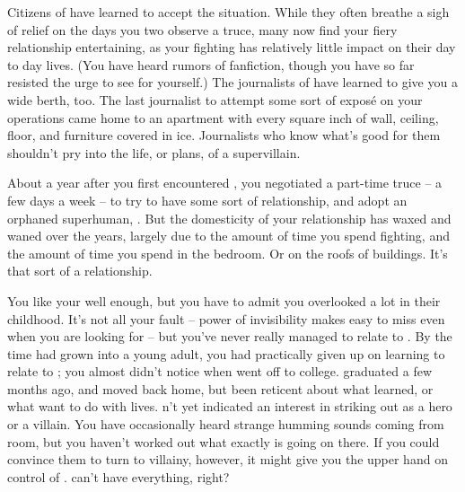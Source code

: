 \documentclass[char]{LRSguildcamp1}
\begin{document}
Citizens of \pCityO{} have learned to accept the situation. While they often breathe a sigh of relief on the days you two observe a truce, many now find your fiery relationship entertaining, as your fighting has relatively little impact on their day to day lives.  (You have heard rumors of fanfiction, though you have so far resisted the urge to see for yourself.)  The journalists of \pCityO{} have learned to give you a wide berth, too.  The last journalist to attempt some sort of expos\'e on your operations came home to an apartment with every square inch of wall, ceiling, floor, and furniture covered in ice.  Journalists who know what's good for them shouldn't pry into the life, or plans, of a supervillain.  

About a year after you first encountered \cOS{}, you negotiated a part-time truce -- a few days a week -- to try to have some sort of relationship, and adopt an orphaned superhuman, \cGrad{}.  
But the domesticity of your relationship has waxed and waned over the years, largely due to the amount of time you spend fighting, and the amount of time you spend in the bedroom.  
Or on the roofs of buildings.  
It's that sort of a relationship.  

You like your \cGrad{\offspring} well enough, but you have to admit you overlooked \cGrad{\them} a lot in their childhood.  
It's not all your fault -- \cGrad{\their} power of invisibility makes \cGrad{\them} easy to miss even when you are looking for \cGrad{\them} -- but you've never really managed to relate to \cGrad{\them}.  
By the time \cGrad{\they} had grown into a young adult, you had practically given up on learning to relate to \cGrad{\them}; you almost didn't notice when \cGrad{} went off to college.  
\cGrad{\They} graduated a few months ago, and moved back home, but \cGrad{\have} been reticent about what \cGrad{\they} learned, or what \cGrad{\they} want to do with \cGrad{\their} lives.  \cGrad{\They} \cGrad{\have}n't yet indicated an interest in striking out as a hero or a villain.  
You have occasionally heard strange humming sounds coming from \cGrad{\their} room, but you haven't worked out what exactly is going on there. %
If you could convince them to turn to villainy, however, it might give you the upper hand on control of \pCityO{}.  \cOS{} can't have everything, right?
\end{document}
